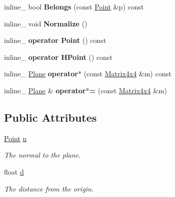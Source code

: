 \begin{DoxyCompactItemize}
\item 
inline\+\_\+ bool {\bfseries Belongs} (const \hyperlink{classPoint}{Point} \&p) const \hypertarget{classPlane_aeaa0a198a1a512310608958a63d7b105}{}\label{classPlane_aeaa0a198a1a512310608958a63d7b105}

\item 
inline\+\_\+ void {\bfseries Normalize} ()\hypertarget{classPlane_a9cf8ba6c1d6abb3f1d045d3ad992118a}{}\label{classPlane_a9cf8ba6c1d6abb3f1d045d3ad992118a}

\item 
inline\+\_\+ {\bfseries operator Point} () const \hypertarget{classPlane_af3990735befb0f7baea5e4eef6a08bf6}{}\label{classPlane_af3990735befb0f7baea5e4eef6a08bf6}

\item 
inline\+\_\+ {\bfseries operator H\+Point} () const \hypertarget{classPlane_ae539171c0c9f44f35570d8c555ca41b5}{}\label{classPlane_ae539171c0c9f44f35570d8c555ca41b5}

\item 
inline\+\_\+ \hyperlink{classPlane}{Plane} {\bfseries operator$\ast$} (const \hyperlink{classMatrix4x4}{Matrix4x4} \&m) const \hypertarget{classPlane_a4dd7d7d75595a796172c4fd126e97074}{}\label{classPlane_a4dd7d7d75595a796172c4fd126e97074}

\item 
inline\+\_\+ \hyperlink{classPlane}{Plane} \& {\bfseries operator$\ast$=} (const \hyperlink{classMatrix4x4}{Matrix4x4} \&m)\hypertarget{classPlane_a25050a542461594859a0b368a80e0af3}{}\label{classPlane_a25050a542461594859a0b368a80e0af3}

\end{DoxyCompactItemize}
\subsection*{Public Attributes}
\begin{DoxyCompactItemize}
\item 
\hyperlink{classPoint}{Point} \hyperlink{classPlane_af400cfb3367fc032b4223a587d605035}{n}\hypertarget{classPlane_af400cfb3367fc032b4223a587d605035}{}\label{classPlane_af400cfb3367fc032b4223a587d605035}

\begin{DoxyCompactList}\small\item\em The normal to the plane. \end{DoxyCompactList}\item 
float \hyperlink{classPlane_a61fc789fce8fbe72914f5397f1bbed44}{d}\hypertarget{classPlane_a61fc789fce8fbe72914f5397f1bbed44}{}\label{classPlane_a61fc789fce8fbe72914f5397f1bbed44}

\begin{DoxyCompactList}\small\item\em The distance from the origin. \end{DoxyCompactList}\end{DoxyCompactItemize}


